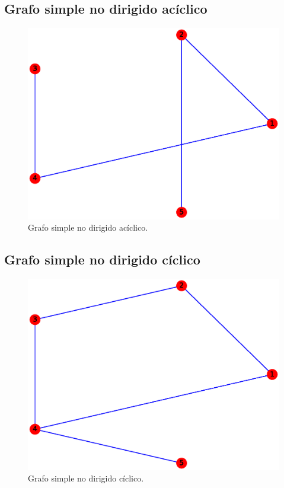 \documentclass{article}
\begin{document}
\subsection{Grafo simple no dirigido acíclico}
\begin{figure}[H]
    \includegraphics[width=\textwidth]{1-GSNDA}
    \caption{Grafo simple no dirigido acíclico.}
    \label{fig:GSNDA}
\end{figure}

\subsection{Grafo simple no dirigido cíclico}
\begin{figure}[H]
    \includegraphics[width=\textwidth]{2-GSNDC}
    \caption{Grafo simple no dirigido cíclico.}
    \label{fig:GSNDC}
\end{figure}
\end{document}
